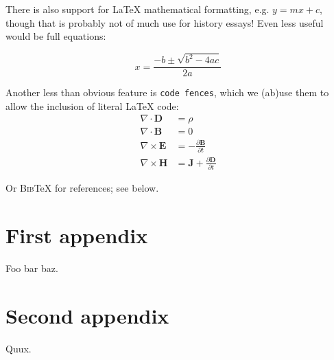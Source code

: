 \documentclass[11pt,a4paper]{article}
\def\BibTeX{{\textsc{Bib}\TeX}}
\begin{document}
There is also support for \LaTeX{} mathematical formatting, e.g. $y=mx+c$, though
that is probably not of much use for history essays! Even less useful would be
full equations:

$$ x = \frac{-b \pm \sqrt{b^2 - 4ac}}{2a} $$

Another less than obvious feature is \verb|code fences|, which we (ab)use them to allow
the inclusion of literal \LaTeX{} code:
\begin{align}
\nabla \cdot \mathbf{D} &= \rho\\
\nabla \cdot \mathbf{B} &= 0\\
\nabla \times \mathbf{E} &= -\frac{\partial \mathbf{B}} {\partial t}\\
\nabla \times \mathbf{H} &= \mathbf{J} + \frac{\partial \mathbf{D}} {\partial t}
\end{align}

Or \BibTeX{} for references; see below.

\printbibliography

\pagebreak

\appendix

\section{First appendix}

Foo bar baz.

\section{Second appendix}

Quux.

\printindex
\end{document}
